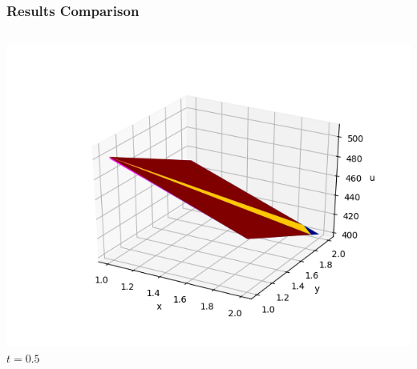 \documentclass[]{beamer}
\begin{document}
\begin{frame}[t]\frametitle{Results Comparison}
  	\begin{columns}
			\begin{center}
			\includegraphics[scale=0.2]{figures/2D_rz_ls1m/2D_rz_ls1mat_u_vs_x_05}\\
			\tiny$t=0.5$
			
			\null
			

\end{center}
\end{columns}
\end{frame}
\end{document}
